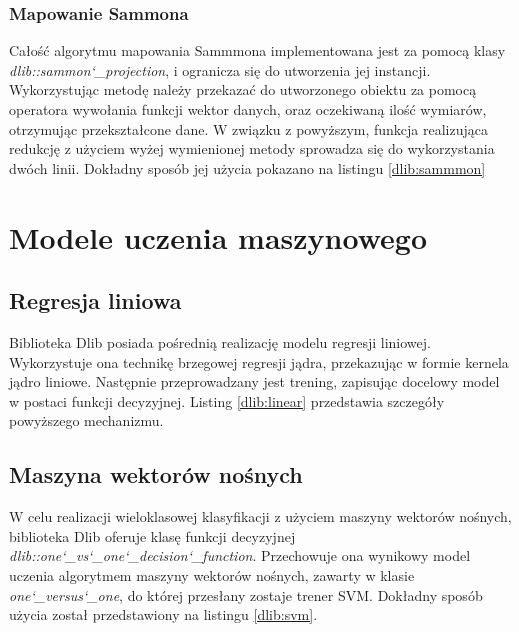 
\subsubsection{Mapowanie Sammona}

Całość algorytmu mapowania Sammmona implementowana jest za pomocą klasy \textit{dlib::sammon\char`_projection}, i ogranicza się do utworzenia jej instancji. Wykorzystując metodę należy przekazać do utworzonego obiektu za pomocą operatora wywołania funkcji wektor danych, oraz oczekiwaną ilość wymiarów, otrzymując przekształcone dane. W związku z powyższym, funkcja realizująca redukcję z użyciem wyżej wymienionej metody sprowadza się do wykorzystania dwóch linii. Dokładny sposób jej użycia pokazano na listingu \ref{dlib:sammmon}


\section{Modele uczenia maszynowego}

\subsection{Regresja liniowa}
Biblioteka Dlib posiada pośrednią realizację modelu regresji liniowej. Wykorzystuje ona technikę brzegowej regresji jądra, przekazując w formie kernela jądro liniowe. Następnie przeprowadzany jest trening, zapisując docelowy model w postaci funkcji decyzyjnej. Listing \ref{dlib:linear} przedstawia szczegóły powyższego mechanizmu.


\subsection{Maszyna wektorów nośnych}

W celu realizacji wieloklasowej klasyfikacji z użyciem maszyny wektorów nośnych, biblioteka Dlib oferuje klasę funkcji decyzyjnej \textit{dlib::one\char`_vs\char`_one\char`_decision\char`_function}. Przechowuje ona wynikowy model uczenia algorytmem maszyny wektorów nośnych, zawarty w klasie \textit{one\char`_versus\char`_one}, do której przesłany zostaje trener SVM. Dokładny sposób użycia został przedstawiony na listingu \ref{dlib:svm}.

